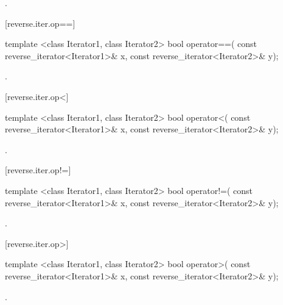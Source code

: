 \begin{itemdescr}
\pnum
\returns
{}.
\end{itemdescr}

[reverse.iter.op==]{}

%
\begin{itemdecl}
template <class Iterator1, class Iterator2>
  bool operator==(
    const reverse_iterator<Iterator1>& x,
    const reverse_iterator<Iterator2>& y);
\end{itemdecl}

\begin{itemdescr}
\pnum
\returns
{}.
\end{itemdescr}

[reverse.iter.op<]{}

%
\begin{itemdecl}
template <class Iterator1, class Iterator2>
  bool operator<(
    const reverse_iterator<Iterator1>& x,
    const reverse_iterator<Iterator2>& y);
\end{itemdecl}

\begin{itemdescr}
\pnum
\returns
{}.
\end{itemdescr}

[reverse.iter.op!=]{}

%
\begin{itemdecl}
template <class Iterator1, class Iterator2>
  bool operator!=(
    const reverse_iterator<Iterator1>& x,
    const reverse_iterator<Iterator2>& y);
\end{itemdecl}

\begin{itemdescr}
\pnum
\returns
{}.
\end{itemdescr}

[reverse.iter.op>]{}

%
\begin{itemdecl}
template <class Iterator1, class Iterator2>
  bool operator>(
    const reverse_iterator<Iterator1>& x,
    const reverse_iterator<Iterator2>& y);
\end{itemdecl}

\begin{itemdescr}
\pnum
\returns
{}.
\end{itemdescr}

